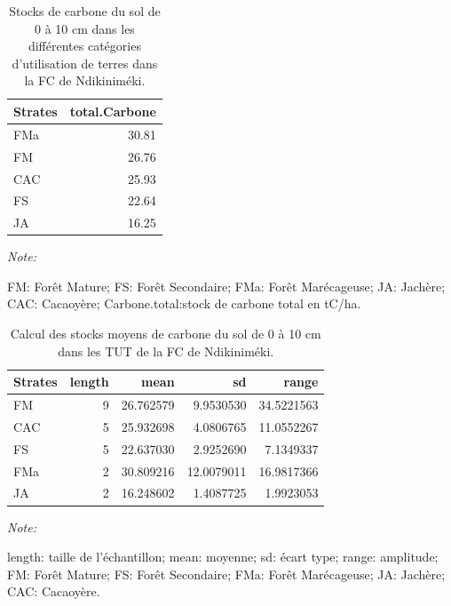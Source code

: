 \documentclass[
  12pt,
  a4paper,
  extrafontsizes,
  onecolumn,
  openright]{book}
\theoremstyle{definition}
\theoremstyle{definition}
\theoremstyle{definition}
\theoremstyle{definition}
\theoremstyle{remark}
\begin{document}
\begin{table}[H]
\centering
\caption{\label{tab:Stockscarbonesolde0-10cmNdikinimeki3}Stocks de carbone du sol de 0 à 10 cm dans les différentes catégories d'utilisation de terres dans la FC de Ndikiniméki.}
\centering
\begin{threeparttable}
\begin{tabular}[t]{lr}
\toprule
Strates & total.Carbone\\
\midrule
FMa & 30.81\\
FM & 26.76\\
CAC & 25.93\\
FS & 22.64\\
JA & 16.25\\
\bottomrule
\end{tabular}
\begin{tablenotes}
\item \textit{Note: } 
\item FM: Forêt Mature; FS: Forêt Secondaire; FMa: Forêt Marécageuse; JA: Jachère; CAC: Cacaoyère; Carbone.total:stock de carbone total en tC/ha.
\end{tablenotes}
\end{threeparttable}
\end{table}

\begin{table}[H]
\centering
\caption{\label{tab:Stocksmoyenssol0-10cmNdikinimki3}Calcul des stocks moyens de carbone du sol de 0 à 10 cm dans les TUT de la FC de Ndikiniméki.}
\centering
\begin{threeparttable}
\begin{tabular}[t]{lrrrr}
\toprule
Strates & length & mean & sd & range\\
\midrule
FM & 9 & 26.762579 & 9.9530530 & 34.5221563\\
CAC & 5 & 25.932698 & 4.0806765 & 11.0552267\\
FS & 5 & 22.637030 & 2.9252690 & 7.1349337\\
FMa & 2 & 30.809216 & 12.0079011 & 16.9817366\\
JA & 2 & 16.248602 & 1.4087725 & 1.9923053\\
\bottomrule
\end{tabular}
\begin{tablenotes}
\item \textit{Note: } 
\item length: taille de l'échantillon; mean: moyenne; sd: écart type; range: amplitude; FM: Forêt Mature; FS: Forêt Secondaire; FMa: Forêt Marécageuse; JA: Jachère; CAC: Cacaoyère.
\end{tablenotes}
\end{threeparttable}
\end{table}
\end{document}
